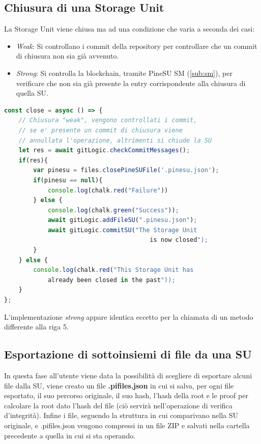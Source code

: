 \subsection{Chiusura di una Storage Unit}
La Storage Unit viene chiusa ma ad una condizione che varia a seconda dei casi:
\begin{itemize}
    \item \emph{Weak}: Si controllano i commit della repository per controllare che un commit di chiusura non sia già avvenuto.
    \item \emph{Strong}: Si controlla la blockchain, tramite PineSU SM (\autoref{sub:sm}), per verificare che non sia già presente la entry corrispondente alla chiusura di quella SU.
\end{itemize}

\begin{lstlisting}[language=JavaScript]
const close = async () => {
    // Chiusura "weak", vengono controllati i commit,
    // se e' presente un commit di chiusura viene
    // annullata l'operazione, altrimenti si chiude la SU
    let res = await gitLogic.checkCommitMessages();
    if(res){
        var pinesu = files.closePineSUFile('.pinesu.json');
        if(pinesu == null){
            console.log(chalk.red("Failure"))
        } else {
            console.log(chalk.green("Success"));
            await gitLogic.addFileSU(".pinesu.json");
            await gitLogic.commitSU("The Storage Unit
                                        is now closed");
        }
    } else {
        console.log(chalk.red("This Storage Unit has
            already been closed in the past"));
    }
};
\end{lstlisting}

L'implementazione \emph{strong} appare identica eccetto per la chiamata di un metodo differente
alla \textsf{riga 5}. 

\subsection{Esportazione di sottoinsiemi di file da una SU}
In questa fase all’utente viene data la possibilità di scegliere di esportare alcuni file dalla SU, viene creato un file \textbf{.pifiles.json} in cui si salva, per ogni file esportato, il suo percorso originale, il suo hash, l’hash della root e le proof per calcolare la root dato l’hash del file (ciò servirà nell’operazione di verifica d’integrità). Infine i file, seguendo la struttura in cui comparivano nella SU originale, e .pifiles.json vengono compressi in un file ZIP e salvati nella cartella precedente a quella in cui si sta operando.

